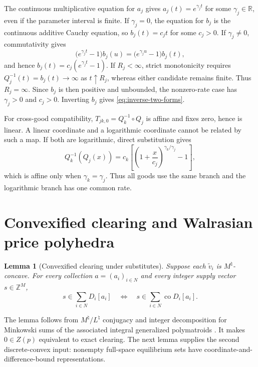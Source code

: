 \documentclass[11pt,a4paper,fleqn]{article}
\theoremstyle{plain}
\newtheorem{lemma}{Lemma}[section]
\theoremstyle{definition}
\newcommand{\R}{\mathbb{R}}
\newcommand{\Z}{\mathbb{Z}}
\newcommand{\co}{\operatorname{co}}
\begin{document}
The continuous multiplicative equation for $a_j$ gives $a_j(t)=e^{\gamma_jt}$ for some $\gamma_j\in\R$, even if the parameter interval is finite. If $\gamma_j=0$, the equation for $b_j$ is the continuous additive Cauchy equation, so $b_j(t)=c_jt$ for some $c_j>0$. If $\gamma_j\ne0$, commutativity gives
\[
\bigl(e^{\gamma_jt}-1\bigr)b_j(u)
=\bigl(e^{\gamma_ju}-1\bigr)b_j(t),
\]
and hence $b_j(t)=c_j(e^{\gamma_jt}-1)$. If $R_j<\infty$, strict monotonicity requires $Q_j^{-1}(t)=b_j(t)\to\infty$ as $t\uparrow R_j$, whereas either candidate remains finite. Thus $R_j=\infty$. Since $b_j$ is then positive and unbounded, the nonzero-rate case has $\gamma_j>0$ and $c_j>0$. Inverting $b_j$ gives \eqref{eq:inverse-two-forms}.

For cross-good compatibility, $T_{jk,0}=Q_k^{-1}\circ Q_j$ is affine and fixes zero, hence is linear. A linear coordinate and a logarithmic coordinate cannot be related by such a map. If both are logarithmic, direct substitution gives
\[
Q_k^{-1}(Q_j(x))
=c_k\left[\left(1+\frac{x}{c_j}\right)^{\gamma_k/\gamma_j}-1\right],
\]
which is affine only when $\gamma_k=\gamma_j$. Thus all goods use the same branch and the logarithmic branch has one common rate.

\section{Convexified clearing and Walrasian price polyhedra}\label{app:walrasian}

\begin{lemma}[Convexified clearing under substitutes]\label{lem:convexified-clearing}
Suppose each $\widetilde v_i$ is $M^\natural$-concave. For every collection $a=(a_i)_{i\in N}$ and every integer supply vector $s\in\Z^M$,
\[
s\in\sum_{i\in N}D_i[a_i]
\quad\Longleftrightarrow\quad
s\in\sum_{i\in N}\co D_i[a_i].
\]
\end{lemma}

The lemma follows from $M^\natural/L^\natural$ conjugacy \citep[Theorem~4.5]{murota2016} and integer decomposition for Minkowski sums of the associated integral generalized polymatroids \citep[equation~(3.1), Theorem~3.1, and Example~3.1]{murotatamura2024}. It makes $0\in Z(p)$ equivalent to exact clearing. The next lemma supplies the second discrete-convex input: nonempty full-space equilibrium sets have coordinate-and-difference-bound representations.
\end{document}
